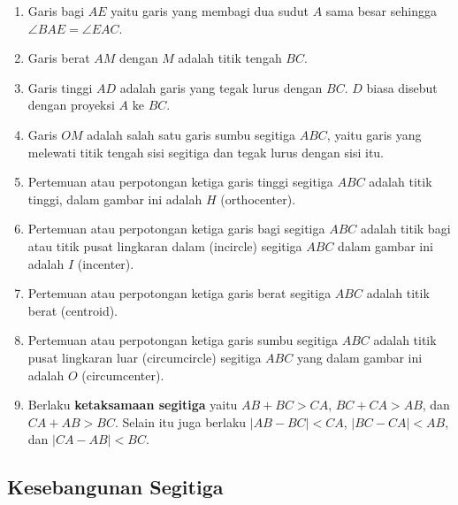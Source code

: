 \begin{enumerate}
    \item Garis bagi $AE$ yaitu garis yang membagi dua sudut $A$ sama besar sehingga $\angle BAE = \angle EAC$. 
    \item Garis berat $AM$ dengan $M$ adalah titik tengah $BC$.
    \item Garis tinggi $AD$ adalah garis yang tegak lurus dengan $BC$. $D$ biasa disebut dengan proyeksi $A$ ke $BC$.
    \item Garis $OM$ adalah salah satu garis sumbu segitiga $ABC$, yaitu garis yang melewati titik tengah sisi segitiga dan tegak lurus dengan sisi itu.
    \item Pertemuan atau perpotongan ketiga garis tinggi segitiga $ABC$ adalah titik tinggi, dalam gambar ini adalah $H$ (orthocenter).
    \item Pertemuan atau perpotongan ketiga garis bagi segitiga $ABC$ adalah titik bagi atau titik pusat lingkaran dalam (incircle) segitiga $ABC$ dalam gambar ini adalah $I$ (incenter).
    \item Pertemuan atau perpotongan ketiga garis berat segitiga $ABC$ adalah titik berat (centroid).
    \item Pertemuan atau perpotongan ketiga garis sumbu segitiga $ABC$ adalah titik pusat lingkaran luar (circumcircle) segitiga $ABC$ yang dalam gambar ini adalah $O$ (circumcenter).
    \item Berlaku \textbf{ketaksamaan segitiga} yaitu $AB+BC>CA$, $BC+CA>AB$, dan $CA+AB>BC$. Selain itu juga berlaku $|AB-BC|<CA$, $|BC-CA|<AB$, dan $|CA-AB|<BC$.
\end{enumerate}
\subsection{Kesebangunan Segitiga}
\begin{center}
\end{center}




